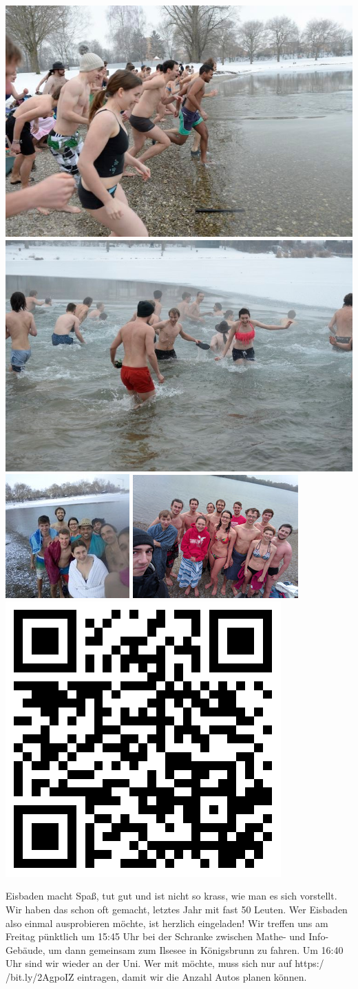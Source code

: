 \documentclass[a4paper,ngerman,landscape]{scrartcl}
\begin{document}
\begin{center}
  \includegraphics[height=0.15\textwidth]{eisbaden-7}
  \includegraphics[height=0.15\textwidth]{eisbaden-5}
  \includegraphics[height=0.15\textwidth]{eisbaden-1}
  \includegraphics[height=0.15\textwidth]{eisbaden-2}
  \includegraphics[height=0.15\textwidth]{eisbaden-qrcode5}
  \vspace{1em}

  \Huge

  \large
  \begin{minipage}{0.92\textwidth}
    \renewcommand{\baselinestretch}{1.3}

    \setlength\parskip{\medskipamount}
    \vspace{0.3em}
    Eisbaden macht Spaß, tut gut und ist nicht so krass, wie man es sich vorstellt.
    Wir haben das schon oft gemacht, letztes Jahr mit fast
    50 Leuten. Wer Eisbaden also einmal ausprobieren möchte, ist herzlich
    eingeladen!
    Wir treffen uns am Freitag pünktlich um 15:45 Uhr bei der
    Schranke zwischen Mathe- und Info-Gebäude, um dann gemeinsam zum Ilsesee in
    Königsbrunn zu fahren. Um 16:40 Uhr sind wir wieder an der Uni.
    Wer mit möchte, muss sich nur auf \textsf{https:/$\!$/bit.ly/2AgpoIZ} eintragen, damit
    wir die Anzahl Autos planen können.
    \vspace{0.3em}
  \end{minipage}


\end{center}
\end{document}

